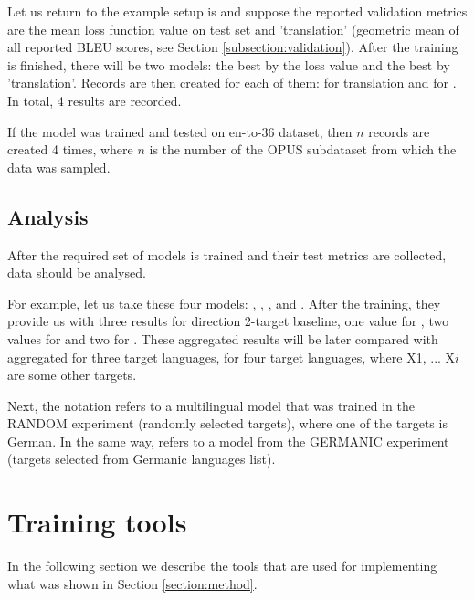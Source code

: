 Let us return to the example setup is  and
suppose the reported validation metrics are the mean loss function value on
test set and 'translation' (geometric mean of all reported BLEU scores,
see Section \ref{subsection:validation}).
After the training is finished, there will be two models: the best by
the loss value and the best by 'translation'.
Records are then created for each of them: for  translation
and for . In total, 4 results are recorded.

If the model was trained and tested on \gls{en-to-36} dataset,
then $n$ records are created 4 times, where $n$
is the number of the OPUS subdataset from which the data was sampled.


\subsection{Analysis}

After the required set of models is trained and their test
metrics are collected, data should be analysed.

For example, let us take these four models: ,
, , and .
After the training, they provide us with three results for 
direction 2-target baseline,
one value for ,
two values for 
and two for .
These aggregated  results will be later compared with
aggregated  for three target languages,
 for four target languages, where X1, ... X$i$ are
some other targets.

Next, the  notation refers to a multilingual
model that was trained in the RANDOM experiment (randomly selected targets),
where one of the targets is German.
In the same way,  refers to a model from
the GERMANIC experiment (targets selected from Germanic languages list).


\section{Training tools}

In the following section we describe the tools that are used for implementing 
what was shown in Section \ref{section:method}.

